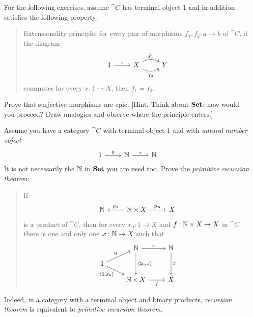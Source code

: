 \begin{exercise}
For the following exercises, assume \(\cat C\) has terminal object \(1\) and in addition satisfies the following property:
\begin{quotation}
{\sc Extensionality principle}: for every pair of morphisms \(f_1, f_2 : a \to b\) of \(\cat C\), if the diagram
\[\begin{tikzcd}
1 \ar["x", r] & X \ar["{f_1}", r, bend left] \ar["{f_2}", r, bend right, swap] & Y
\end{tikzcd}\]
commutes for every \(x : 1 \to X\), then \(f_1 = f_2\).
\end{quotation}
\begin{tcbenum}
\item Prove that surjective morphisms are epic. [Hint. Think about \(\mathbf{Set}\): how would you proceed? Draw analogies and observe where the principle enters.]
%
\item {}
\end{tcbenum}
\end{exercise}

\begin{exercise}
Assume you have a category \(\cat C\) with terminal object \(1\) and with {\em natural number object}
\[\begin{tikzcd}
1 \ar["0", r] & \naturals \ar["s", r] & \naturals
\end{tikzcd}\]
It is not necessarily the \(\mathbb N\) in \(\mathbf{Set}\) you are used too. Prove the {\em primitive recursion theorem}:
\begin{quotation}
If
\[\begin{tikzcd}
\naturals & \naturals \times X \ar["{p_\naturals}", l, swap] \ar["{p_X}", r] & X
\end{tikzcd}\]
is a product of \(\cat C\), then for every \(x_0 : 1 \to X\) and \(f : \mathbb N \times X \to X\) in \(\cat C\) there is one and only one \(x : \mathbb N \to X\) such that
\[\begin{tikzcd}[row sep=small]
& \naturals \ar["s", r] \ar["{\angled{\id_\naturals, x}}", dd] & \naturals \ar["x", dd] \\
1 \ar["0", ur] \ar["{\angled{0, x_0}}", dr, swap] \\
& \naturals \times X \ar["f", r, swap] & X
\end{tikzcd}\]
\end{quotation}
Indeed, in a category with a terminal object and binary products, {\em recursion theorem} is equivalent to {\em primitive recursion theorem}. 
\end{exercise}

